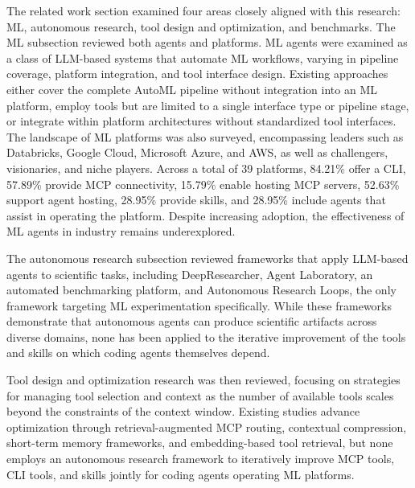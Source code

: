 \documentclass[
english,                 %
bibtex,                  %
includeExtraAbstracts, %
]{kththesis}
\numberwithin{listing}{chapter}
\begin{document}
The related work section examined four areas closely aligned with this research: \gls{ML}, autonomous research, tool design and optimization, and benchmarks. The \gls{ML} subsection reviewed both agents and platforms. \Gls{ML} agents were examined as a class of \gls{LLM}-based systems that automate \gls{ML} workflows, varying in pipeline coverage, platform integration, and tool interface design. Existing approaches either cover the complete \gls{AutoML} pipeline without integration into an \gls{ML} platform, employ tools but are limited to a single interface type or pipeline stage, or integrate within platform architectures without standardized tool interfaces. The landscape of \gls{ML} platforms was also surveyed, encompassing leaders such as Databricks, Google Cloud, Microsoft Azure, and \gls{AWS}, as well as challengers, visionaries, and niche players. Across a total of 39 platforms, 84.21\% offer a \gls{CLI}, 57.89\% provide \gls{MCP} connectivity, 15.79\% enable hosting \gls{MCP} servers, 52.63\% support agent hosting, 28.95\% provide skills, and 28.95\% include agents that assist in operating the platform. Despite increasing adoption, the effectiveness of \gls{ML} agents in industry remains underexplored.

The autonomous research subsection reviewed frameworks that apply \gls{LLM}-based agents to scientific tasks, including DeepResearcher, Agent Laboratory, an automated benchmarking platform, and Autonomous Research Loops, the only framework targeting \gls{ML} experimentation specifically. While these frameworks demonstrate that autonomous agents can produce scientific artifacts across diverse domains, none has been applied to the iterative improvement of the tools and skills on which coding agents themselves depend.

Tool design and optimization research was then reviewed, focusing on strategies for managing tool selection and context as the number of available tools scales beyond the constraints of the context window. Existing studies advance optimization through retrieval-augmented \gls{MCP} routing, contextual compression, short-term memory frameworks, and embedding-based tool retrieval, but none employs an autonomous research framework to iteratively improve \gls{MCP} tools, \gls{CLI} tools, and skills jointly for coding agents operating \gls{ML} platforms.
\end{document}
